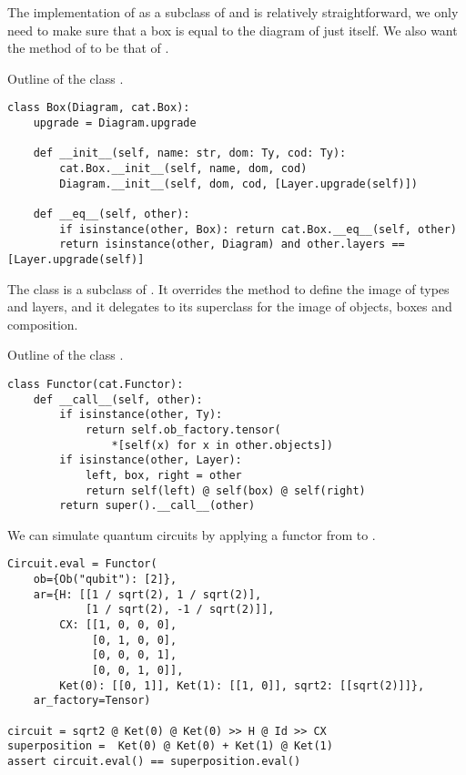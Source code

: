 The implementation of  as a subclass of  and  is relatively straightforward, we only need to make sure that a box is equal to the diagram of just itself.
We also want the  method of  to be that of .

\begin{python}
{\normalfont Outline of the class .}
\begin{verbatim}
class Box(Diagram, cat.Box):
    upgrade = Diagram.upgrade

    def __init__(self, name: str, dom: Ty, cod: Ty):
        cat.Box.__init__(self, name, dom, cod)
        Diagram.__init__(self, dom, cod, [Layer.upgrade(self)])

    def __eq__(self, other):
        if isinstance(other, Box): return cat.Box.__eq__(self, other)
        return isinstance(other, Diagram) and other.layers == [Layer.upgrade(self)]
\end{verbatim}
\end{python}

The  class is a subclass of .
It overrides the  method to define the image of types and layers, and it delegates to its superclass for the image of objects, boxes and composition.

\begin{python}
{\normalfont Outline of the class .}
\begin{verbatim}
class Functor(cat.Functor):
    def __call__(self, other):
        if isinstance(other, Ty):
            return self.ob_factory.tensor(
                *[self(x) for x in other.objects])
        if isinstance(other, Layer):
            left, box, right = other
            return self(left) @ self(box) @ self(right)
        return super().__call__(other)
\end{verbatim}
\end{python}

\begin{example}
We can simulate quantum circuits by applying a functor from  to .
\begin{verbatim}
Circuit.eval = Functor(
    ob={Ob("qubit"): [2]},
    ar={H: [[1 / sqrt(2), 1 / sqrt(2)],
            [1 / sqrt(2), -1 / sqrt(2)]],
        CX: [[1, 0, 0, 0],
             [0, 1, 0, 0],
             [0, 0, 0, 1],
             [0, 0, 1, 0]],
        Ket(0): [[0, 1]], Ket(1): [[1, 0]], sqrt2: [[sqrt(2)]]},
    ar_factory=Tensor)

circuit = sqrt2 @ Ket(0) @ Ket(0) >> H @ Id >> CX
superposition =  Ket(0) @ Ket(0) + Ket(1) @ Ket(1)
assert circuit.eval() == superposition.eval()
\end{verbatim}
\end{example}

